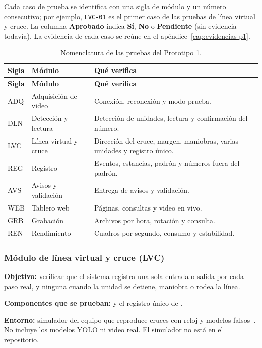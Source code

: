 Cada caso de prueba se identifica con una sigla de módulo y un número
consecutivo; por ejemplo, \texttt{LVC-01} es el primer caso de las pruebas
de línea virtual y cruce. La columna \textbf{Aprobado} indica
\textbf{Sí}, \textbf{No} o \textbf{Pendiente} (sin evidencia todavía). La
evidencia de cada caso se reúne en el apéndice~\ref{cap:evidencias-p1}.

\begin{longtable}{@{}L{1.4cm}L{4.0cm}L{8.6cm}@{}}
  \caption{Nomenclatura de las pruebas del Prototipo 1.}
  \label{tab:nomenclatura-p1} \\
  \toprule
  \textbf{Sigla} & \textbf{Módulo} & \textbf{Qué verifica} \\
  \midrule
  \endfirsthead
  \toprule
  \textbf{Sigla} & \textbf{Módulo} & \textbf{Qué verifica} \\
  \midrule
  \endhead
  ADQ & Adquisición de video & Conexión, reconexión y modo prueba. \\
  DLN & Detección y lectura & Detección de unidades, lectura y
    confirmación del número. \\
  LVC & Línea virtual y cruce & Dirección del cruce, margen, maniobras,
    varias unidades y registro único. \\
  REG & Registro & Eventos, estancias, padrón y números fuera del padrón. \\
  AVS & Avisos y validación & Entrega de avisos y validación. \\
  WEB & Tablero web & Páginas, consultas y video en vivo. \\
  GRB & Grabación & Archivos por hora, rotación y consulta. \\
  REN & Rendimiento & Cuadros por segundo, consumo y estabilidad. \\
  \bottomrule
\end{longtable}

\subsubsection{Módulo de línea virtual y cruce (LVC)}

\textbf{Objetivo:} verificar que el sistema registra una sola entrada o
salida por cada paso real, y ninguna cuando la unidad se detiene, maniobra
o rodea la línea.

\textbf{Componentes que se prueban:}  y el
registro único de .

\textbf{Entorno:} simulador del equipo que reproduce cruces con reloj y
modelos falsos~\cite{rep-fusion,rep-tecnico}. No incluye los modelos YOLO
ni video real. El simulador no está en el repositorio.

